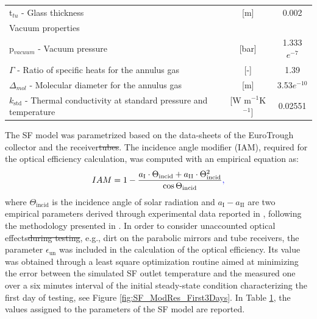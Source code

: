 \documentclass[final,3p,times,review]{elsarticle}
\providecommand{\DIFadd}[1]{{\protect\color{blue}\uwave{#1}}} %
\providecommand{\DIFdel}[1]{{\protect\color{red}\sout{#1}}}                      %
\providecommand{\DIFaddbegin}{} %
\providecommand{\DIFaddend}{} %
\providecommand{\DIFdelbegin}{} %
\providecommand{\DIFdelend}{} %
\begin{document}
\begin{table}[h!]
\begin{tabularx}{\textwidth}{Xcc}
		\hspace*{0.3cm} t$_{tu}$ - Glass thickness  & [m] & 0.002\\
		Vacuum properties &  &  \\
		\hspace*{0.3cm} p$_{vacuum}$ - Vacuum pressure & [bar] & 1.333$e^{-7}$\\
		\hspace*{0.3cm} $\Gamma$ - Ratio of specific heats for the annulus gas & [-] & 1.39\\
		\hspace*{0.3cm} $\Delta_{mol}$ - Molecular diameter for the annulus gas & [m] & 3.53$e^{-10}$\\
		\hspace*{0.3cm} $k_\mathrm{std}$ - Thermal conductivity at standard pressure and temperature & [W m$^{-1}$K$^{-1}$] & 0.02551\\
		\bottomrule
	\end{tabularx}%
	\label{tab:SF_parameter}%
\end{table}%
%
The SF model was parametrized based on the data-sheets of the EuroTrough collector and the receiver\DIFdelbegin \DIFdel{tubes}\DIFdelend . The incidence angle modifier (IAM), required for the optical efficiency calculation, was computed with an empirical equation as:
%
\begin{equation}
IAM = 1 - \frac{a_\mathrm{I} \cdot \Theta_\mathrm{incid} + a_\mathrm{II}\cdot \Theta_\mathrm{incid}^2}{\cos{\Theta_\mathrm{incid}}}\DIFaddbegin \DIFadd{,
}\DIFaddend \end{equation} 
%
where $\Theta_\mathrm{incid}$ is the incidence angle of solar radiation and $a_\mathrm{I}-a_\mathrm{II}$ are two empirical parameters derived through experimental data reported in \cite{Sallaberry2016}, following the methodology presented in \cite{Valenzuela2014}. In order to consider unaccounted optical effects\DIFdelbegin \DIFdel{during testing}\DIFdelend , e.g., dirt on the parabolic mirrors and tube receivers, the parameter $\epsilon_\mathrm{un}$ was included in the calculation of the optical efficiency. Its value was obtained through a least square optimization routine aimed at minimizing the error between the simulated SF outlet temperature and the measured one over a six minutes interval  of the initial steady-state condition characterizing the first day of testing, see Figure \ref{fig:SF_ModRes_First3Days}. In Table \ref{tab:SF_parameter}, the values assigned to the parameters of the SF model are reported.
%
\end{document}
